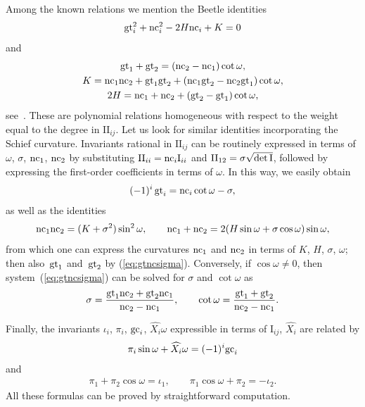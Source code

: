 \documentclass[pdftex]{sigma}
\def\I#1#2{\mathrm{I}_{#1#2}}
\def\II#1#2{\mathrm{II}_{#1#2}}
\def\nc#1{{\mathop{\rm nc}}_{#1}}
\def\gc#1{{\mathop{\rm gc}}_{#1}}
\def\gtor#1{{{\rm gt}}_{#1}}
\def\detI{{\rm det\,I}}
\def\eqref#1{{\rm(\ref{#1})}}
\numberwithin{equation}{section}
\begin{document}
Among the known relations we mention the
Beetle identities~\cite[equation~(10)]{Beetle}
\[
\gtor i^2 + \nc i^2 - 2 H \nc i + K = 0
\]
and
\begin{gather*}
{\gtor 1} + {\gtor 2} = (\nc 2 - \nc 1) \cot\omega,
\\
K = {\nc1 \nc2 + \gtor1 \gtor2} + (\nc1 \gtor2 - \nc2 \gtor1) \cot \omega,
\\
2 H = {\nc1 + \nc2} + (\gtor2 - \gtor1) \cot \omega,
\end{gather*}
see~\cite{WS-I,WS-II,WS-III}.
These are polynomial relations homogeneous
with respect to the weight equal to the degree in $\II ij$.
Let us look for similar identities incorporating the Schief curvature.
Invariants rational in $\II ij$ can be routinely
expressed in terms of $\omega$, $\sigma$, $\nc 1$, $\nc 2$
by substituting $\II ii = \nc i \I ii$ and
$\II 12 = \sigma \sqrt{\detI}$, followed by expressing the
first-order coefficients in terms of $\omega$.
In this way, we easily obtain
\begin{gather}\label{eq:gtncsigma}
(-1)^i\,{\gtor i} = \nc i \cot\omega - \sigma,
\end{gather}
as well as the identities
\[
\nc1\nc2 = (K + \sigma^2) \sin^2\omega,
\qquad
\nc1 + \nc2 = 2 (H \sin\omega + \sigma \cos\omega) \sin\omega,
\]
from which one can express the curvatures $\nc1$ and $\nc2$ in terms
of $K$, $H$, $\sigma$, $\omega$;
then also~$\gtor1$ and~$\gtor2$ by \eqref{eq:gtncsigma}.
Conversely, if $\cos\omega \ne 0$, then
system~\eqref{eq:gtncsigma} can be solved for $\sigma$
and $\cot\omega$ as
\[
\sigma = \frac{\gtor1 \nc2 + \gtor2 \nc1}{\nc2 - \nc1},
\qquad
\cot\omega = \frac{\gtor1 + \gtor2}{\nc2 - \nc1}.
\]

Finally, the invariants $\iota_i$, $\pi_i$, $\gc i$, $\widehat{X_i} \omega$ expressible
in terms of $\I ij$, $\widehat{X_i}$ are related by
\begin{gather}\label{eq:pigc}
\pi_i \sin\omega + \widehat{X_i} \omega  = (-1)^i \gc i
\end{gather}
and
\begin{gather}\label{eq:iotapi}
\pi_1 + \pi_2 \cos\omega = \iota_1, \qquad
\pi_1 \cos\omega + \pi_2 = {-\iota_2}.
\end{gather}
All these formulas can be proved by straightforward computation.
\end{document}
